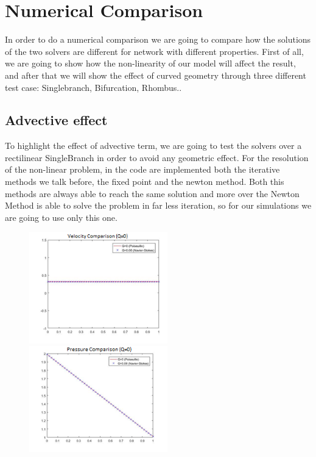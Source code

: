 \documentclass[a4paper]{report}
\begin{document}
\section{Numerical Comparison}
In order to do a numerical comparison we are going to compare how the solutions of the two solvers are different for network with different properties. First of all, we are going to show how the non-linearity of our model will affect the result, and after that we will show the effect of curved geometry through three different test case: Singlebranch, Bifurcation, Rhombus..


\subsection{Advective effect }
To highlight the effect of advective term, we are going to test the solvers over a rectilinear SingleBranch in order to avoid any geometric effect. For the resolution of the non-linear problem, in the code are implemented both the iterative methods we talk before, the fixed point and the newton method. Both this methods are always able to reach the same solution and more over the Newton Method is able to solve the problem in far less iteration, so for our simulations we are going to use only this one.
\begin{figure}[htbp]
\centering
\includegraphics[width= 60mm]{Pressure_Gain_0}%
\qquad \qquad
\includegraphics[width= 60mm]{Pressure_Gain_1}
\end{figure}
\end{document}
